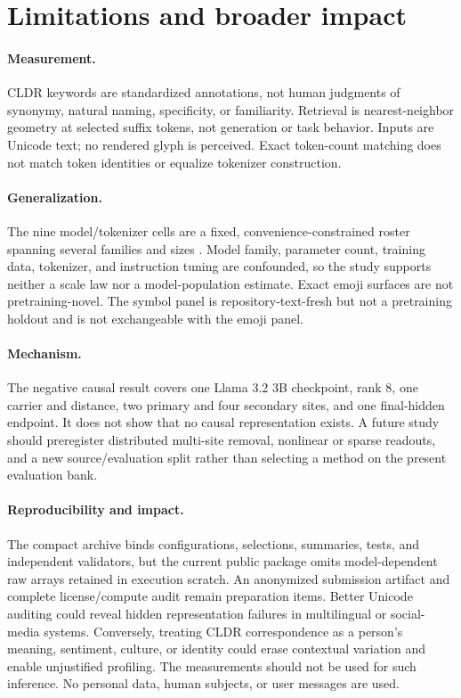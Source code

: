 \documentclass{article}
\begin{document}
\section{Limitations and broader impact}

\paragraph{Measurement.}
CLDR keywords are standardized annotations, not human judgments of synonymy,
natural naming, specificity, or familiarity. Retrieval is nearest-neighbor
geometry at selected suffix tokens, not generation or task behavior. Inputs
are Unicode text; no rendered glyph is perceived. Exact token-count matching
does not match token identities or equalize tokenizer construction.

\paragraph{Generalization.}
The nine model/tokenizer cells are a fixed, convenience-constrained roster
spanning several families and sizes \citep{yang2024qwen25,groeneveld2024olmo,
dubey2024llama3,gemmateam2024gemma2,jiang2023mistral,smollm2modelcard}. Model
family, parameter count, training data, tokenizer, and instruction tuning are
confounded, so the study supports neither a scale law nor a model-population
estimate. Exact emoji surfaces are not pretraining-novel. The symbol panel is
repository-text-fresh but not a pretraining holdout and is not exchangeable
with the emoji panel.

\paragraph{Mechanism.}
The negative causal result covers one Llama 3.2 3B checkpoint, rank 8, one
carrier and distance, two primary and four secondary sites, and one
final-hidden endpoint. It does not show that no causal representation exists.
A future study should preregister distributed multi-site removal, nonlinear or
sparse readouts, and a new source/evaluation split rather than selecting a
method on the present evaluation bank.

\paragraph{Reproducibility and impact.}
The compact archive binds configurations, selections, summaries, tests, and
independent validators, but the current public package omits model-dependent
raw arrays retained in execution scratch. An anonymized submission artifact
and complete license/compute audit remain preparation items. Better Unicode
auditing could reveal hidden representation failures in multilingual or
social-media systems. Conversely, treating CLDR correspondence as a person's
meaning, sentiment, culture, or identity could erase contextual variation and
enable unjustified profiling. The measurements should not be used for such
inference. No personal data, human subjects, or user messages are used.
\end{document}
